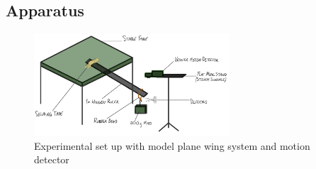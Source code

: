 \documentclass[12pt]{article}
\begin{document}
\vspace{-4mm}

\subsection{Apparatus}

\vspace{-7mm}

\begin{figure}[H]
    \centering
    \includegraphics[width=0.65\textwidth]{images/apparatus.jpg}
    \caption{Experimental set up with model plane wing system and motion detector}
    \label{fig:apparatus}
\end{figure}
\end{document}
